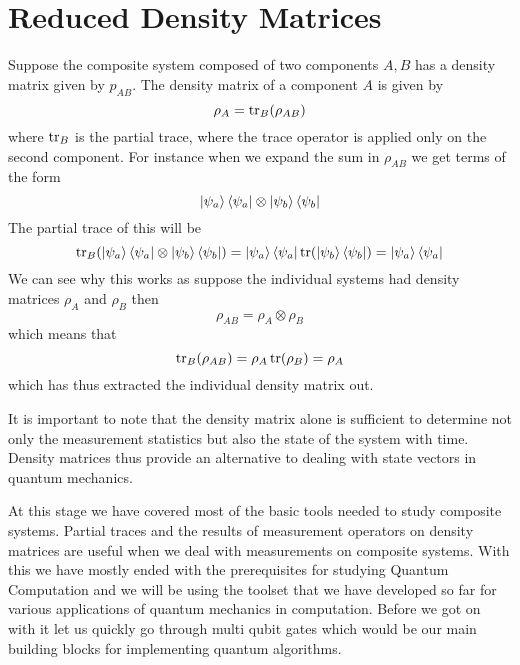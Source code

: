 \section{Reduced Density Matrices}
Suppose the composite system composed of two components $A, B$ has a density matrix given by $p_{AB}$. The density matrix of a component $A$ is given by 
$$ \rho_A = \tr_{B}(\rho_{AB})$$ 
where $\tr_{B}$ is the partial trace, where the trace operator is applied only on the second component. For instance when we expand the sum in $\rho_{AB}$ we get terms of the form 
$$\ket{\psi_a}\bra{\psi_a} \otimes \ket{\psi_b}\bra{\psi_b}$$ The partial trace of this will be $$\tr_{B}(\ket{\psi_a}\bra{\psi_a} \otimes \ket{\psi_b}\bra{\psi_b}) = \ket{\psi_a}\bra{\psi_a} \tr(\ket{\psi_b}\bra{\psi_b}) \\ = \ket{\psi_a}\bra{\psi_a} $$
We can see why this works as suppose the individual systems had density matrices $\rho_A$ and $\rho_B$ then $$\rho_{AB} = \rho_A \otimes \rho_B$$ which means that $$\tr_{B}(\rho_{AB}) = \rho_A \tr(\rho_B) = \rho_A$$ which has thus extracted the individual density matrix out.

It is important to note that the density matrix alone is sufficient to determine not only the measurement statistics but also the state of the system with time. Density matrices thus provide an alternative to dealing with state vectors in quantum mechanics.

At this stage we have covered most of the basic tools needed to study composite systems. Partial traces and the results of measurement operators on density matrices are useful when we deal with measurements on composite systems. 
With this we have mostly ended with the prerequisites for studying Quantum Computation and we will be using the toolset that we have developed so far for various applications of quantum mechanics in computation. Before we got on with it let us quickly go through multi qubit gates which would be our main building blocks for implementing quantum algorithms.
\clearpage
